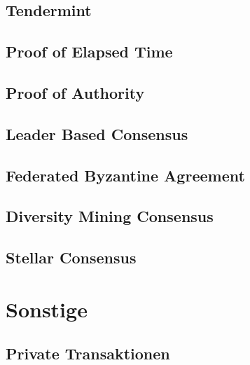 \subsection{Tendermint}

\subsection{Proof of Elapsed Time}

\subsection{Proof of Authority}

\subsection{Leader Based Consensus}

\subsection{Federated Byzantine Agreement}

\subsection{Diversity Mining Consensus}

\subsection{Stellar Consensus}



\section{Sonstige}

\subsection{Private Transaktionen}

